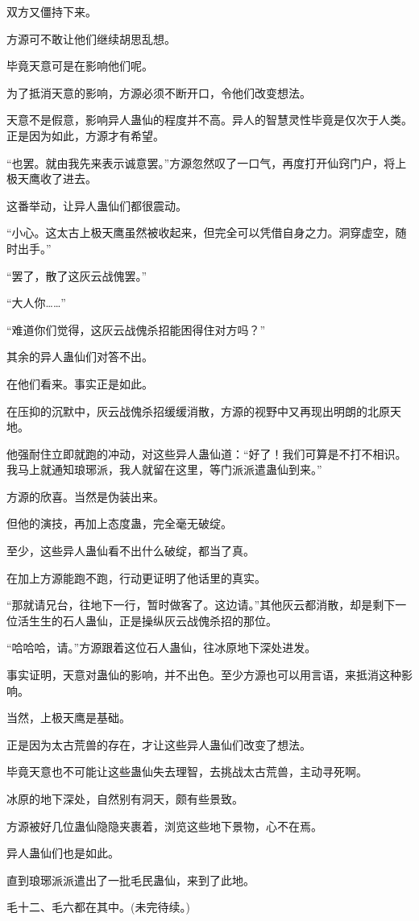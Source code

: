 \begin{this_body}
双方又僵持下来。

方源可不敢让他们继续胡思乱想。

毕竟天意可是在影响他们呢。

为了抵消天意的影响，方源必须不断开口，令他们改变想法。

天意不是假意，影响异人蛊仙的程度并不高。异人的智慧灵性毕竟是仅次于人类。正是因为如此，方源才有希望。

“也罢。就由我先来表示诚意罢。”方源忽然叹了一口气，再度打开仙窍门户，将上极天鹰收了进去。

这番举动，让异人蛊仙们都很震动。

“小心。这太古上极天鹰虽然被收起来，但完全可以凭借自身之力。洞穿虚空，随时出手。”

“罢了，散了这灰云战傀罢。”

“大人你……”

“难道你们觉得，这灰云战傀杀招能困得住对方吗？”

其余的异人蛊仙们对答不出。

在他们看来。事实正是如此。

在压抑的沉默中，灰云战傀杀招缓缓消散，方源的视野中又再现出明朗的北原天地。

他强耐住立即就跑的冲动，对这些异人蛊仙道：“好了！我们可算是不打不相识。我马上就通知琅琊派，我人就留在这里，等门派派遣蛊仙到来。”

方源的欣喜。当然是伪装出来。

但他的演技，再加上态度蛊，完全毫无破绽。

至少，这些异人蛊仙看不出什么破绽，都当了真。

在加上方源能跑不跑，行动更证明了他话里的真实。

“那就请兄台，往地下一行，暂时做客了。这边请。”其他灰云都消散，却是剩下一位活生生的石人蛊仙，正是操纵灰云战傀杀招的那位。

“哈哈哈，请。”方源跟着这位石人蛊仙，往冰原地下深处进发。

事实证明，天意对蛊仙的影响，并不出色。至少方源也可以用言语，来抵消这种影响。

当然，上极天鹰是基础。

正是因为太古荒兽的存在，才让这些异人蛊仙们改变了想法。

毕竟天意也不可能让这些蛊仙失去理智，去挑战太古荒兽，主动寻死啊。

冰原的地下深处，自然别有洞天，颇有些景致。

方源被好几位蛊仙隐隐夹裹着，浏览这些地下景物，心不在焉。

异人蛊仙们也是如此。

直到琅琊派派遣出了一批毛民蛊仙，来到了此地。

毛十二、毛六都在其中。(未完待续。)

\end{this_body}

